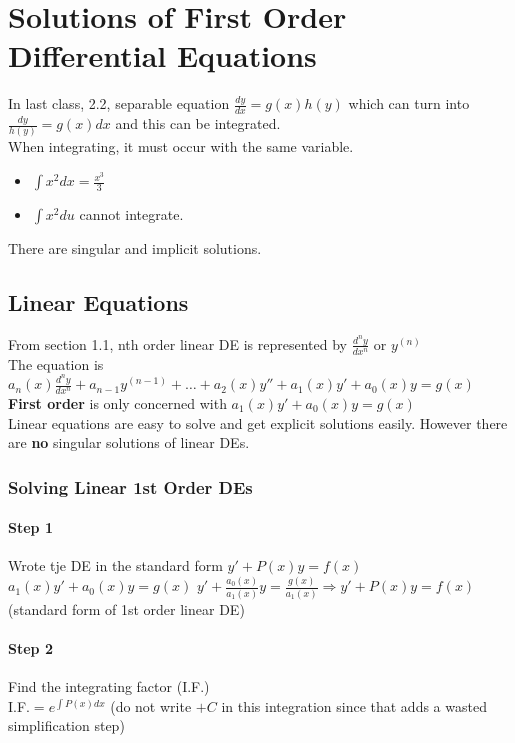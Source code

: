 \documentclass{article}
\begin{document}
\newpage
\section{Solutions of First Order Differential Equations}
In last class, 2.2, separable equation $\frac{dy}{dx}=g(x)h(y)$ which can turn into $\frac{dy}{h(y)}=g(x)dx$ and this can be integrated.
\\When integrating, it must occur with the same variable.
\begin{itemize}
    \item $\int x^2dx=\frac{x^3}{3}$
    \item $\int x^2du$ cannot integrate.
\end{itemize}
There are singular and implicit solutions.

\subsection{Linear Equations}
From section 1.1, nth order linear DE is represented by $\frac{d^ny}{dx^n}$ or $y^{(n)}$
\\The equation is $a_n(x)\frac{d^ny}{dx^n}+a_{n-1}y^{(n-1)}+\dots+a_2(x)y''+a_1(x)y'+a_0(x)y=g(x)$
\\\textbf{First order} is only concerned with $a_1(x)y'+a_0(x)y=g(x)$
\\Linear equations are easy to solve and get explicit solutions easily. However there are \textbf{no} singular solutions of linear DEs.

\subsubsection{Solving Linear 1st Order DEs}
\paragraph{Step 1} Wrote tje DE in the standard form $y'+P(x)y=f(x)$\\
$a_1(x)y'+a_0(x)y=g(x)$
$y'+\frac{a_0(x)}{a_1(x)}y=\frac{g(x)}{a_1(x)}\Rightarrow y'+P(x)y=f(x)$ (standard form of 1st order linear DE)

\paragraph{Step 2} Find the integrating factor (I.F.)
\\I.F.$=e^{\int\!P(x)dx}$ (do not write $+C$ in this integration since that adds a wasted simplification step)
\end{document}
